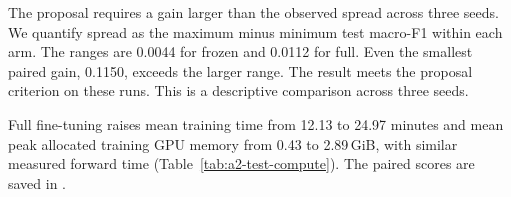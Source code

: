 The proposal requires a gain larger than the observed spread across three seeds. We quantify spread as the maximum minus minimum test macro-F1 within each arm. The ranges are 0.0044 for frozen and 0.0112 for full. Even the smallest paired gain, 0.1150, exceeds the larger range. The result meets the proposal criterion on these runs. This is a descriptive comparison across three seeds.

Full fine-tuning raises mean training time from 12.13 to 24.97 minutes and mean peak allocated training GPU memory from 0.43 to 2.89\,GiB, with similar measured forward time (Table~\ref{tab:a2-test-compute}). The paired scores are saved in .
